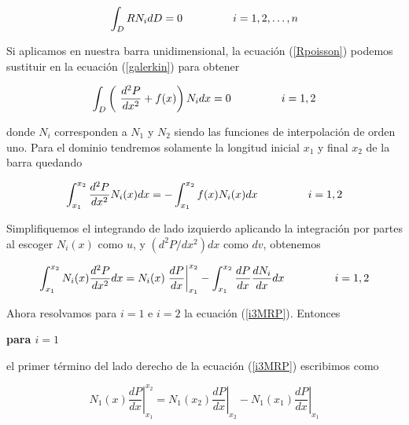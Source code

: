 \documentclass[10pt,a4paper]{article}
\begin{document}
\begin{equation}\label{galerkin}
  \displaystyle \int_DRN_idD=0 \hspace*{0.9cm} \mbox { } \hspace*{0.6cm} i=1,2,\dots,n
\end{equation}
 
Si aplicamos en nuestra barra unidimensional, la ecuaci\'on (\ref{Rpoisson}) podemos sustituir en la ecuaci\'on (\ref{galerkin}) para obtener

\begin{equation}\label{i1MRP}
  \displaystyle \int_D\left(\ \frac{d^2P}{dx^2}+f(x) \right)N_idx=0 \hspace*{0.9cm} \mbox { } \hspace*{0.6cm} i=1,2
\end{equation}
 
\noindent donde $N_i$ corresponden a $N_1$ y $N_2$ siendo las funciones de interpolaci\'on de orden uno. Para el dominio tendremos solamente la longitud inicial $x_1$ y final $x_2$ de la barra quedando

\begin{equation}\label{i2MRP}
  \displaystyle \int_{x_1}^{x_2} \frac{d^2P}{dx^2}N_i(x)dx=-\int_{x_1}^{x_2}f(x)N_i(x)dx \hspace*{0.9cm} \mbox { } \hspace*{0.6cm} i=1,2
\end{equation}
 
Simplifiquemos el integrando de lado izquierdo aplicando la integraci\'on por partes al escoger $N_i(x)$  como $u$, y $(d^2P/dx^2)dx$ como $dv$, obtenemos

\begin{equation}\label{i3MRP}
  \displaystyle \int_{x_1}^{x_2} N_i(x)\frac{d^2P}{dx^2}dx=N_i(x) \left . \frac{dP}{dx} \right |_{x_1}^{x_2} -\int_{x_1}^{x_2}\frac{dP}{dx}\frac{dN_i}{dx}dx \hspace*{0.9cm} \mbox { } \hspace*{0.6cm} i=1,2 
\end{equation}

Ahora resolvamos para $i=1$ e $i=2$ la ecuaci\'on (\ref{i3MRP}). Entonces

  \bigskip

{\bf para $i=1$}

  \bigskip

\noindent el primer t\'ermino del lado derecho de la ecuaci\'on (\ref{i3MRP}) escribimos como

\begin{equation}\label{i4MRP}
 N_1(x) \left .\frac{dP}{dx} \right |_{x_1}^{x_2}= N_1(x_2)\left .\frac{dP}{dx}\right |_{x_2}-N_1(x_1)\left .\frac{dP}{dx}\right |_{x_1}
\end{equation}
\end{document}
